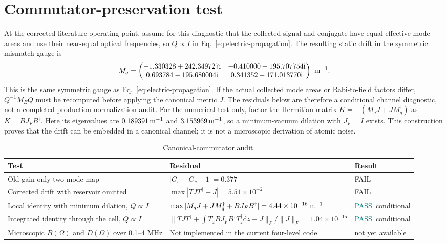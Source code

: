 \documentclass[11pt,a4paper]{article}
\newcommand{\dd}{\mathrm d}
\newcommand{\ii}{\mathrm i}
\newcommand{\pending}{\textcolor{amber}{not yet available}}
\newcommand{\pass}{\textcolor{teal}{PASS}}
\newcommand{\fail}{\textcolor{red!70!black}{FAIL}}
\begin{document}
\clearpage
\section{Commutator-preservation test}

At the corrected literature operating point, assume for this diagnostic that
the collected signal and conjugate have equal effective mode areas and use
their near-equal optical frequencies, so $Q\propto I$ in
Eq.~\eqref{eq:electric-propagation}. The resulting static drift in the
symmetric mismatch gauge is
\[
M_q=
\begin{pmatrix}
-1.330328+242.349727\ii&-0.410000+195.707754\ii\\
 0.693784-195.680004\ii&0.341352-171.013770\ii
\end{pmatrix}\ {\rm m}^{-1}.
\]
This is the same symmetric gauge as Eq.~\eqref{eq:electric-propagation}.
If the actual collected mode areas or Rabi-to-field factors differ,
$Q^{-1}M_EQ$ must be recomputed before applying the canonical metric $J$.
The residuals below are therefore a conditional channel diagnostic, not a
completed production normalization audit.
For the numerical test only, factor the Hermitian matrix
$K=-(M_qJ+JM_q^\dagger)$ as $K=BJ_FB^\dagger$. Here its eigenvalues are
$0.189391\,{\rm m}^{-1}$ and $3.153969\,{\rm m}^{-1}$, so a
minimum-vacuum dilation with $J_F=I$ exists. This construction proves that
the drift can be embedded in a canonical channel; it is not a microscopic
derivation of atomic noise.

\begin{table}[ht]
\centering
\caption{Canonical-commutator audit.}
\label{tab:commutator-test}
\small
\begin{tabularx}{\textwidth}{L{4.2cm}Y L{2.0cm}}
\toprule
Test & Residual & Result\\
\midrule
Old gain-only two-mode map &
$|G_s-G_c-1|=0.377$ & \fail\\
Corrected drift with reservoir omitted &
$\max|TJT^\dagger-J|=5.51\times10^{-2}$ & \fail\\
Local identity with minimum dilation, $Q\propto I$ &
$\max|M_qJ+JM_q^\dagger+BJ_FB^\dagger|=4.44\times10^{-16}\,{\rm m}^{-1}$ &
\pass\ conditional\\
Integrated identity through the cell, $Q\propto I$ &
$\|TJT^\dagger+\int T_zBJ_FB^\dagger T_z^\dagger\dd z-J\|_F/
\|J\|_F=1.04\times10^{-15}$ & \pass\ conditional\\
Microscopic $B(\Omega)$ and $D(\Omega)$ over 0.1--4 MHz &
Not implemented in the current four-level code & \pending\\
\bottomrule
\end{tabularx}
\end{table}
\end{document}
